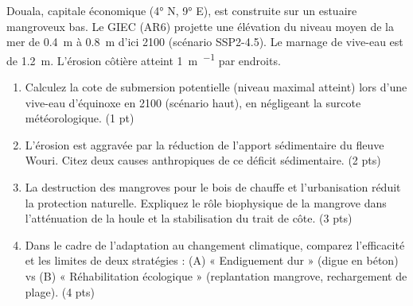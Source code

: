 \documentclass[11pt]{article}
\begin{document}
\begin{exercice}
\label{exo:risque_cotier}
Douala, capitale économique (4° N, 9° E), est construite sur un estuaire mangroveux bas. Le GIEC (AR6) projette une élévation du niveau moyen de la mer de \SI{0,4}{\meter} à \SI{0,8}{\meter} d'ici 2100 (scénario SSP2-4.5). Le marnage de vive-eau est de \SI{1,2}{\meter}. L'érosion côtière atteint \SI{1}{\meter\per{}} par endroits.

\begin{enumerate}
    \item Calculez la cote de submersion potentielle (niveau maximal atteint) lors d'une vive-eau d'équinoxe en 2100 (scénario haut), en négligeant la surcote météorologique. \hfill (1 pt)
    \item L'érosion est aggravée par la réduction de l'apport sédimentaire du fleuve Wouri. Citez deux causes anthropiques de ce déficit sédimentaire. \hfill (2 pts)
    \item La destruction des mangroves pour le bois de chauffe et l'urbanisation réduit la protection naturelle. Expliquez le rôle biophysique de la mangrove dans l'atténuation de la houle et la stabilisation du trait de côte. \hfill (3 pts)
    \item Dans le cadre de l'adaptation au changement climatique, comparez l'efficacité et les limites de deux stratégies : (A) « Endiguement dur » (digue en béton) vs (B) « Réhabilitation écologique » (replantation mangrove, rechargement de plage). \hfill (4 pts)
\end{enumerate}
\end{exercice}
\end{document}
